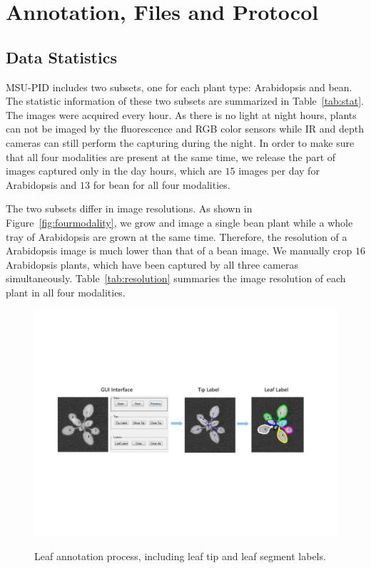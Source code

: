 \section{Annotation, Files and Protocol}
\subsection{Data Statistics}
MSU-PID includes two subsets, one for each plant type: Arabidopsis and bean.
The statistic information of these two subsets are summarized in Table~\ref{tab:stat}.
The images were acquired every hour.
As there is no light at night hours, plants can not be imaged by the fluorescence and RGB color sensors while IR and depth cameras can still perform the capturing during the night.
In order to make sure that all four modalities are present at the same time, we release the part of images captured only in the day hours, which are $15$ images per day for Arabidopsis and $13$ for bean for all four modalities.

The two subsets differ in image resolutions.
As shown in Figure~\ref{fig:fourmodality}, we grow and image a single bean plant while a whole tray of Arabidopsis are grown at the same time.
Therefore, the resolution of a Arabidopsis image is much lower than that of a bean image.
We manually crop $16$ Arabidopsis plants, which have been captured by all three cameras simultaneously.
Table~\ref{tab:resolution} summaries the image resolution of each plant in all four modalities.


\begin{figure}
\centering
\includegraphics[width=.90\textwidth]{Figures/labeling}\\
\caption{Leaf annotation process, including leaf tip and leaf segment labels.}
\label{fig:label}
\end{figure}

